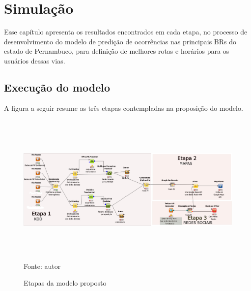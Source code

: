 \chapter{Simulação}\label{simula}

Esse capítulo apresenta os resultados encontrados em cada etapa, no processo de desenvolvimento do modelo de predição de ocorrências nas principais BRs do estado de Pernambuco, para definição de melhores rotas e horários para os usuários dessas vias.


\section{Execução do modelo}

A figura a seguir resume as três etapas contempladas na proposição do modelo.

\begin{figure}[ht]
\centering
\caption{Etapas da modelo proposto}
\includegraphics[width=175mm, height=75mm]{Figuras/Cronograma/metodologia.png}\\
\tiny Fonte: autor
\end{figure}

